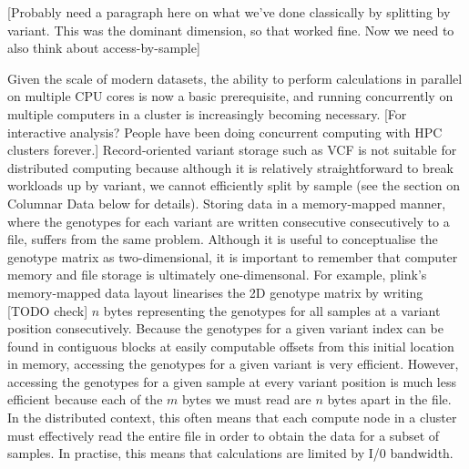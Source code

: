 \documentclass[a4paper,num-refs]{oup-contemporary}
\begin{document}
[Probably need a paragraph here on what we've done classically
by splitting by variant. This was the dominant dimension, so that
worked fine. Now we need to also think about access-by-sample]

Given the scale of modern datasets, the ability to perform
calculations in parallel on multiple CPU cores
is now a basic prerequisite, and
running concurrently on multiple computers in a cluster
is increasingly becoming necessary. [For interactive analysis? People have
been doing concurrent computing with HPC clusters forever.]
Record-oriented variant storage such as VCF is not suitable
for  distributed computing because although it is relatively
straightforward to break workloads up by variant, we cannot efficiently
split by sample (see the section on Columnar Data below for details).
Storing data in a memory-mapped manner, where the genotypes
for each variant are written consecutive consecutively to a file,
suffers from the same problem. Although it is useful to conceptualise
the genotype matrix as two-dimensional, it is important to remember
that computer memory and file storage is ultimately one-dimensonal.
For example, plink's memory-mapped data layout linearises the 2D
genotype matrix by writing [TODO check] $n$ bytes representing
the genotypes for all samples at a variant position consecutively.
Because the genotypes for a given variant index can be found
in contiguous blocks at easily computable offsets from
this initial location in memory,
accessing the genotypes for a given variant is very efficient.
However, accessing the genotypes for a given sample at every
variant position is much less efficient because each of the $m$ bytes we
must read are $n$ bytes apart in the file.
In the distributed context, this often means
that each compute node  in a
cluster must effectively read the entire file in order to obtain the
data for a subset of samples. In practise, this means that calculations
are limited by I/0 bandwidth.
\end{document}
